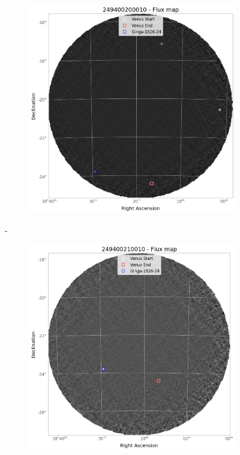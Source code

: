 \documentclass[
	a4paper, %
	10pt, %
	unnumberedsections, %
	twoside, %
]{LTJournalArticle}
\begin{document}
        \begin{figure}[H]
        \centering
        \begin{subfigure}{.3\textwidth}
            \includegraphics[width=\textwidth]{report/Figures/methods/2204/20_map.png}
        \end{subfigure}%
        \hspace{1em}-
        \begin{subfigure}{.3\textwidth}
            \centering
            \includegraphics[width=\textwidth]{report/Figures/methods/2204/21_map.png}

\end{subfigure}
\end{figure}
\end{document}
